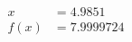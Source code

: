 \documentclass[preview]{standalone}
\begin{document}
\begin{align*}
x &= 4.9851\\f(x) &= 7.9999724
\end{align*}
\end{document}
